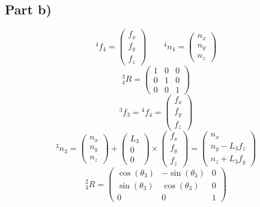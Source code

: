 \documentclass[10pt,a4paper]{article}
\begin{document}
\subsection*{Part b)}

\begin{equation*}
  {}^{4}f_{4} = \begin{pmatrix}
    f_{x}\\f_{y}\\f_{z}
  \end{pmatrix}
  \qquad
  {}^{4}n_{4} = \begin{pmatrix}
    n_{x}\\n_{y}\\n_{z}
  \end{pmatrix}
\end{equation*}
\begin{equation*}
  {}_{4}^{3}R = \begin{pmatrix}
    1 & 0 & 0\\
    0 & 1 & 0\\
    0 & 0 & 1
  \end{pmatrix}
\end{equation*}
\begin{equation*}
  {}^{3}f_{3} = {}^{4}f_{4} = \begin{pmatrix}
    f_{x}\\f_{y}\\f_{z}
  \end{pmatrix}
\end{equation*}
\begin{equation*}
  {}^{3}n_{3} = \begin{pmatrix}
    n_{x}\\n_{y}\\n_{z}
  \end{pmatrix} + \begin{pmatrix}
    L_{3}\\0\\0
  \end{pmatrix} \times \begin{pmatrix}
    f_{x}\\f_{y}\\f_{z}
  \end{pmatrix} = \begin{pmatrix}
    n_{x}\\
    n_{y} - L_{3}f_{z}\\
    n_{z} + L_{3}f_{y}
  \end{pmatrix}
\end{equation*}
\begin{equation*}
  {}_{3}^{2}R = \begin{pmatrix}
    \cos(\theta_{3}) & -\sin(\theta_{3}) & 0\\
    \sin(\theta_{3}) & \cos(\theta_{3}) & 0\\
    0 & 0 & 1
  \end{pmatrix}
\end{equation*}
\end{document}
